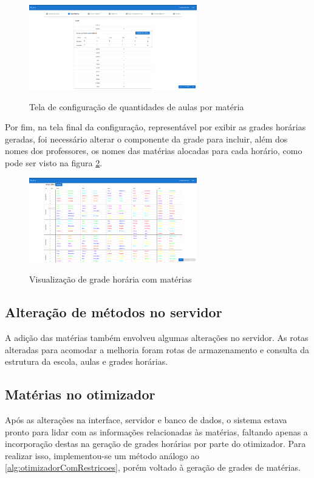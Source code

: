 \begin{figure}[!htb]
	\centering
	\caption{Tela de configuração de quantidades de aulas por matéria}
	\includegraphics[width=0.65\textwidth]{./dados/figuras/alteracaoAulas}
	\label{fig:alteracaoAulas}
\end{figure}

Por fim, na tela final da configuração, representável por exibir as grades horárias geradas, foi necessário alterar o componente da grade para incluir, além dos nomes dos professores, os nomes das matérias alocadas para cada horário, como pode ser visto na figura \ref{fig:alteracaoHorario}.

\begin{figure}[!htb]
	\centering
	\caption{Visualização de grade horária com matérias}
	\includegraphics[width=0.65\textwidth]{./dados/figuras/alteracaoHorarios}
	\label{fig:alteracaoHorario}
\end{figure}

\subsection{Alteração de métodos no servidor}
A adição das matérias também envolveu algumas alterações no servidor. As rotas alteradas para acomodar a melhoria foram rotas de armazenamento e consulta da estrutura da escola, aulas e grades horárias.

\subsection{Matérias no otimizador}
Após as alterações na interface, servidor e banco de dados, o sistema estava pronto para lidar com as informações relacionadas às matérias, faltando apenas a incorporação destas na geração de grades horárias por parte do otimizador. Para realizar isso, implementou-se um método análogo ao \autoref{alg:otimizadorComRestricoes}, porém voltado à geração de grades de matérias.

